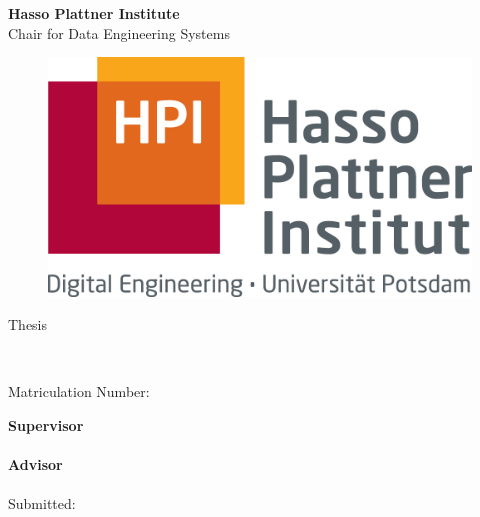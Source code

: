 \begin{titlepage}
\begin{center}
\LARGE{\textbf{Hasso Plattner Institute}}\\
\normalsize{Chair for Data Engineering Systems}\\[0.3cm]

\begin{figure}[h!]
    \centering
    \includegraphics[width=.3\linewidth]{images/hpi_logo.jpg}
\end{figure}
\vspace{1cm}

\LARGE{{\thesisType} Thesis}\\[0.7cm]
\Huge{\textbf{\thesisTitle}}

\vspace{0.4cm}

\Large{\germanTitle}

\vspace{1cm} 

\Large{\textbf{\name}} \\[3pt]  
\vspace{0.5cm}

\large{Matriculation Number: \matriculationNumber} \\
\vspace{1cm}

\large{\textbf{Supervisor}}\\
\supervisor\\
\vspace{0.5cm}
\textbf{Advisor}\\
\advisor\\

\vspace{1cm}
\large{Submitted: \submissionDate} \\ 

\end{center}
\end{titlepage}
